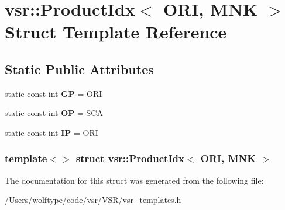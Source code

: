 \hypertarget{structvsr_1_1_product_idx_3_01_o_r_i_00_01_m_n_k_01_4}{\section{vsr\-:\-:Product\-Idx$<$ O\-R\-I, M\-N\-K $>$ Struct Template Reference}
\label{structvsr_1_1_product_idx_3_01_o_r_i_00_01_m_n_k_01_4}
}
\subsection*{Static Public Attributes}
\begin{DoxyCompactItemize}
\item 
\hypertarget{structvsr_1_1_product_idx_3_01_o_r_i_00_01_m_n_k_01_4_ac29bb1a199328dbc1b998eadadfd14e4}{static const int {\bfseries G\-P} = O\-R\-I}\label{structvsr_1_1_product_idx_3_01_o_r_i_00_01_m_n_k_01_4_ac29bb1a199328dbc1b998eadadfd14e4}

\item 
\hypertarget{structvsr_1_1_product_idx_3_01_o_r_i_00_01_m_n_k_01_4_acc613b244843a95a184e0d98862c8d4f}{static const int {\bfseries O\-P} = S\-C\-A}\label{structvsr_1_1_product_idx_3_01_o_r_i_00_01_m_n_k_01_4_acc613b244843a95a184e0d98862c8d4f}

\item 
\hypertarget{structvsr_1_1_product_idx_3_01_o_r_i_00_01_m_n_k_01_4_a02006c8700a04e6c0735524cb39d9fae}{static const int {\bfseries I\-P} = O\-R\-I}\label{structvsr_1_1_product_idx_3_01_o_r_i_00_01_m_n_k_01_4_a02006c8700a04e6c0735524cb39d9fae}

\end{DoxyCompactItemize}
\subsubsection*{template$<$$>$ struct vsr\-::\-Product\-Idx$<$ O\-R\-I, M\-N\-K $>$}



The documentation for this struct was generated from the following file\-:\begin{DoxyCompactItemize}
\item 
/\-Users/wolftype/code/vsr/\-V\-S\-R/vsr\-\_\-templates.\-h\end{DoxyCompactItemize}
